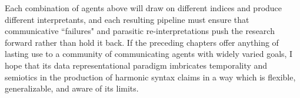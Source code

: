 Each combination of agents above will draw on different indices and produce different interpretants, and each resulting pipeline must ensure that communicative ``failures" and parasitic re-interpretations push the research forward rather than hold it back.  If the preceding chapters offer anything of lasting use to a community of communicating agents with widely varied goals, I hope that its data representational paradigm imbricates temporality and semiotics in the production of harmonic syntax claims in a way which is flexible, generalizable, and aware of its limits.